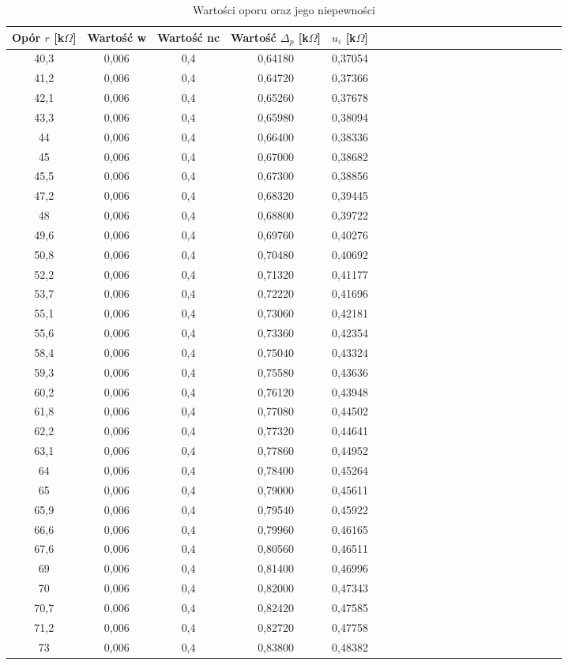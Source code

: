 \documentclass[10pt,a4paper]{article}
\begin{document}
\begin{center}
\begin{center}
 \begin{table}[h!]
 \centering
 \caption{Wartości oporu oraz jego niepewności}
 \label{t1}
 \begin{tabular}{|c|c|c|c|c|c|c|c|c|c|c|c|c|c|c|c|c|c|c|c|c|c|}
 \hline
Opór $r$ [k$\Omega$]&Wartość w& Wartość nc&Wartość $\Delta_{p}$ [k$\Omega$]& $u_{i}$ [k$\Omega$]\\ 
\hline
40,3 & 0,006 & 0,4 & 0,64180 & 0,37054 \\ \hline
41,2 & 0,006 & 0,4 & 0,64720 & 0,37366 \\ \hline
42,1 & 0,006 & 0,4 & 0,65260 & 0,37678 \\ \hline
43,3 & 0,006 & 0,4 & 0,65980 & 0,38094 \\ \hline
44   & 0,006 & 0,4 & 0,66400 & 0,38336 \\ \hline
45   & 0,006 & 0,4 & 0,67000 & 0,38682 \\ \hline
45,5 & 0,006 & 0,4 & 0,67300 & 0,38856 \\ \hline
47,2 & 0,006 & 0,4 & 0,68320 & 0,39445 \\ \hline
48   & 0,006 & 0,4 & 0,68800 & 0,39722 \\ \hline
49,6 & 0,006 & 0,4 & 0,69760 & 0,40276 \\ \hline
50,8 & 0,006 & 0,4 & 0,70480 & 0,40692 \\ \hline
52,2 & 0,006 & 0,4 & 0,71320 & 0,41177 \\ \hline
53,7 & 0,006 & 0,4 & 0,72220 & 0,41696 \\ \hline
55,1 & 0,006 & 0,4 & 0,73060 & 0,42181 \\ \hline
55,6 & 0,006 & 0,4 & 0,73360 & 0,42354 \\ \hline
58,4 & 0,006 & 0,4 & 0,75040 & 0,43324 \\ \hline
59,3 & 0,006 & 0,4 & 0,75580 & 0,43636 \\ \hline
60,2 & 0,006 & 0,4 & 0,76120 & 0,43948 \\ \hline
61,8 & 0,006 & 0,4 & 0,77080 & 0,44502 \\ \hline
62,2 & 0,006 & 0,4 & 0,77320 & 0,44641 \\ \hline
63,1 & 0,006 & 0,4 & 0,77860 & 0,44952 \\ \hline
64   & 0,006 & 0,4 & 0,78400 & 0,45264 \\ \hline
65   & 0,006 & 0,4 & 0,79000 & 0,45611 \\ \hline
65,9 & 0,006 & 0,4 & 0,79540 & 0,45922 \\ \hline
66,6 & 0,006 & 0,4 & 0,79960 & 0,46165 \\ \hline
67,6 & 0,006 & 0,4 & 0,80560 & 0,46511 \\ \hline
69   & 0,006 & 0,4 & 0,81400 & 0,46996 \\ \hline
70   & 0,006 & 0,4 & 0,82000 & 0,47343 \\ \hline
70,7 & 0,006 & 0,4 & 0,82420 & 0,47585 \\ \hline
71,2 & 0,006 & 0,4 & 0,82720 & 0,47758 \\ \hline
73   & 0,006 & 0,4 & 0,83800 & 0,48382 \\ \hline


\end{tabular}
\end{table}
\end{center}
\end{center}
\end{document}
